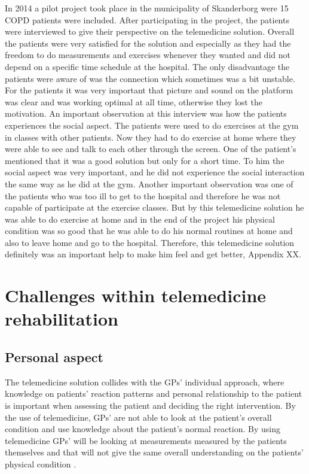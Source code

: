 In 2014 a pilot project took place in the municipality of Skanderborg were 15 COPD patients were included. After participating in the project, the patients were interviewed to give their perspective on the telemedicine solution. Overall the patients were very satisfied for the solution and especially as they had the freedom to do measurements and exercises whenever they wanted and did not depend on a specific time schedule at the hospital. The only disadvantage the patients were aware of was the connection which sometimes was a bit unstable. For the patients it was very important that picture and sound on the platform was clear and was working optimal at all time, otherwise they lost the motivation. An important observation at this interview was how the patients experiences the social aspect. The patients were used to do exercises at the gym in classes with other patients. Now they had to do exercise at home where they were able to see and talk to each other through the screen. One of the patient’s mentioned that it was a good solution but only for a short time. To him the social aspect was very important, and he did not experience the social interaction the same way as he did at the gym. Another important observation was one of the patients who was too ill to get to the hospital and therefore he was not capable of participate at the exercise classes. But by this telemedicine solution he was able to do exercise at home and in the end of the project his physical condition was so good that he was able to do his normal routines at home and also to leave home and go to the hospital. Therefore, this telemedicine solution definitely was an important help to make him feel and get better, Appendix XX.  


\section{Challenges within telemedicine rehabilitation} 
\subsection{Personal aspect}
The telemedicine solution collides with the GPs’ individual approach, where knowledge on patients’ reaction patterns and personal relationship to the patient is important when assessing the patient and deciding the right intervention. By the use of telemedicine, GPs’ are not able to look at the patient’s overall condition and use knowledge about the patient’s normal reaction. By using telemedicine GPs’ will be looking at measurements measured by the patients themselves and that will not give the same overall understanding on the patients’ physical condition \cite{Emergence}.  

